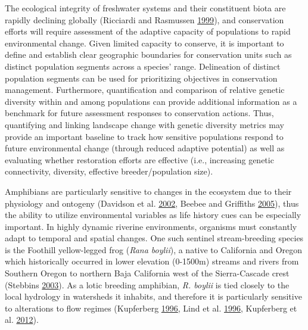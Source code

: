 \documentclass[proquest,12pt,final]{ucthesis-CA2012} %
\begin{document}
\begin{ucmainmatter}
The ecological integrity of freshwater systems and their constituent
biota are rapidly declining globally (Ricciardi and Rasmussen
\protect\hyperlink{ref-ricciardi_extinction_1999}{1999}), and
conservation efforts will require assessment of the adaptive capacity of
populations to rapid environmental change. Given limited capacity to
conserve, it is important to define and establish clear geographic
boundaries for conservation units such as distinct population segments
across a species' range. Delineation of distinct population segments can
be used for prioritizing objectives in conservation management.
Furthermore, quantification and comparison of relative genetic diversity
within and among populations can provide additional information as a
benchmark for future assessment responses to conservation actions. Thus,
quantifying and linking landscape change with genetic diversity metrics
may provide an important baseline to track how sensitive populations
respond to future environmental change (through reduced adaptive
potential) as well as evaluating whether restoration efforts are
effective (i.e., increasing genetic connectivity, diversity, effective
breeder/population size).

Amphibians are particularly sensitive to changes in the ecosystem due to
their physiology and ontogeny (Davidson et al.
\protect\hyperlink{ref-davidson_spatial_2002}{2002}, Beebee and
Griffiths \protect\hyperlink{ref-beebee_amphibian_2005}{2005}), thus the
ability to utilize environmental variables as life history cues can be
especially important. In highly dynamic riverine environments, organisms
must constantly adapt to temporal and spatial changes. One such sentinel
stream-breeding species is the Foothill yellow-legged frog (\emph{Rana
boylii}), a native to California and Oregon which historically occurred
in lower elevation (0-1500m) streams and rivers from Southern Oregon to
northern Baja California west of the Sierra-Cascade crest (Stebbins
\protect\hyperlink{ref-stebbins_field_2003}{2003}). As a lotic breeding
amphibian, \emph{R. boylii} is tied closely to the local hydrology in
watersheds it inhabits, and therefore it is particularly sensitive to
alterations to flow regimes (Kupferberg
\protect\hyperlink{ref-kupferberg_hydrologic_1996}{1996}, Lind et al.
\protect\hyperlink{ref-lind_effects_1996}{1996}, Kupferberg et al.
\protect\hyperlink{ref-kupferberg_effects_2012}{2012}).


\end{ucmainmatter}
\end{document}
